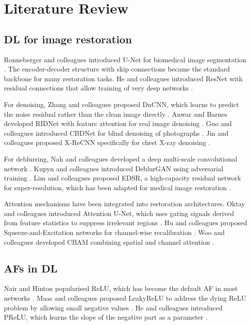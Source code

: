 
\section{Literature Review}
\label{sec:lr}
\subsection{DL for image restoration}

Ronneberger and colleagues introduced U-Net for biomedical image segmentation \citep{ronneberger2015unet}. The encoder-decoder structure with skip connections became the standard backbone for many restoration tasks. He and colleagues introduced ResNet with residual connections that allow training of very deep networks \citep{he2016deep}.

For denoising, Zhang and colleagues proposed DnCNN, which learns to predict the noise residual rather than the clean image directly \citep{zhang2017beyond}. Anwar and Barnes developed RIDNet with feature attention for real image denoising \citep{anwar2019real}. Guo and colleagues introduced CBDNet for blind denoising of photographs \citep{guo2019toward}. Jin and colleagues proposed X-ReCNN specifically for chest X-ray denoising \citep{jin2019chest}.

For deblurring, Nah and colleagues developed a deep multi-scale convolutional network \citep{nah2017deep}. Kupyn and colleagues introduced DeblurGAN using adversarial training \citep{kupyn2019deblurgan}. Lim and colleagues proposed EDSR, a high-capacity residual network for super-resolution, which has been adapted for medical image restoration \citep{lim2017enhanced}.

Attention mechanisms have been integrated into restoration architectures. Oktay and colleagues introduced Attention U-Net, which uses gating signals derived from feature statistics to suppress irrelevant regions \citep{oktay2018attention}. Hu and colleagues proposed Squeeze-and-Excitation networks for channel-wise recalibration \citep{hu2018squeeze}. Woo and colleagues developed CBAM combining spatial and channel attention \citep{woo2018cbam}.

\subsection{AFs in DL}

Nair and Hinton popularised ReLU, which has become the default AF in most networks \citep{nair2010rectified}. Maas and colleagues proposed LeakyReLU to address the dying ReLU problem by allowing small negative values \citep{maas2013rectifier}. He and colleagues introduced PReLU, which learns the slope of the negative part as a parameter \citep{he2015delving}.

